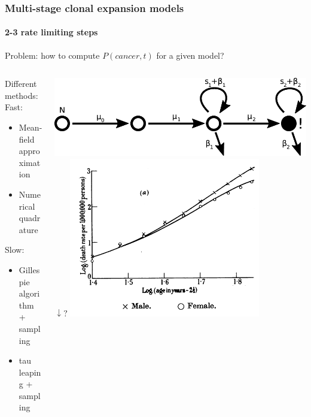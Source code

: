 \documentclass{beamer}
\begin{document}
\begin{frame}
    \frametitle{Multi-stage clonal expansion models}
    \framesubtitle{2-3 rate limiting steps\footnotemark[123]}
    Problem: how to compute $P(cancer, t)$ for a given model?

    \begin{columns}
        \begin{column}{0.5\textwidth}
        \begin{center}
        \end{center}
        Different methods:
        Fast:
        \begin{itemize}
            \item Mean-field approximation\footnotemark[1]
            \item Numerical quadrature\footnotemark[2]
        \end{itemize}
        Slow:
        \begin{itemize}
            \item Gillespie algorithm + sampling \footnotemark[3]
            \item tau leaping + sampling \footnotemark[3]
        \end{itemize}
        \end{column}
        \begin{column}{0.5\textwidth}
        \begin{center}
            \includegraphics[width=1.00\textwidth]{figures/diagram3}
            $\downarrow?$
            \includegraphics[width=0.75\textwidth]{figures/ArmitageDoll1957_4A.png}
        \end{center}
        \end{column}
    \end{columns}


\end{frame}
\end{document}
